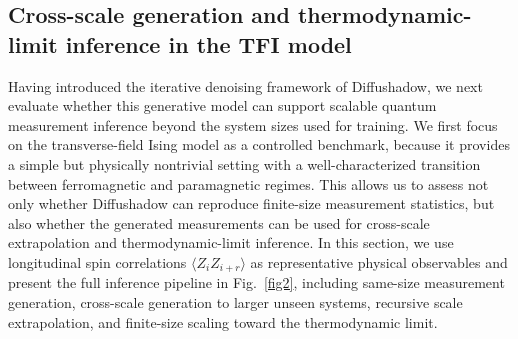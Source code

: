 \documentclass[pdflatex,sn-mathphys-num]{sn-jnl}%
\theoremstyle{thmstyleone}%
\theoremstyle{thmstyletwo}%
\theoremstyle{thmstylethree}%
\begin{document}
\subsection{Cross-scale generation and thermodynamic-limit inference in the TFI model}


Having introduced the iterative denoising framework of Diffushadow, we next evaluate whether this generative model can support scalable quantum measurement inference beyond the system sizes used for training. We first focus on the transverse-field Ising model as a controlled benchmark, because it provides a simple but physically nontrivial setting with a well-characterized transition between ferromagnetic and paramagnetic regimes. This allows us to assess not only whether Diffushadow can reproduce finite-size measurement statistics, but also whether the generated measurements can be used for cross-scale extrapolation and thermodynamic-limit inference. In this section, we use longitudinal spin correlations \(\langle Z_i Z_{i+r}\rangle\) as representative physical observables and present the full inference pipeline in Fig.~\ref{fig2}, including same-size measurement generation, cross-scale generation to larger unseen systems, recursive scale extrapolation, and finite-size scaling toward the thermodynamic limit.
\end{document}
